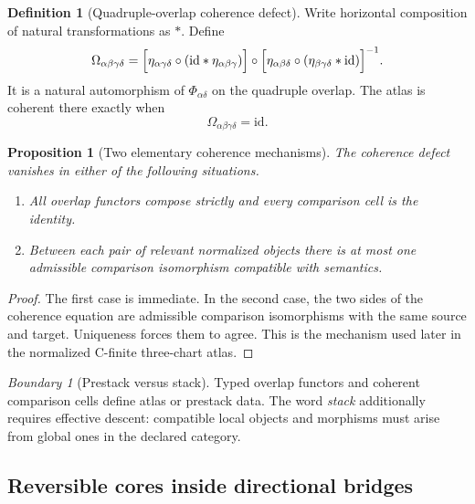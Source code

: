 \documentclass[11pt]{article}
\newtheorem{proposition}[theorem]{Proposition}
\theoremstyle{definition}
\newtheorem{definition}[theorem]{Definition}
\theoremstyle{remark}
\newtheorem{boundary}[theorem]{Boundary}
\newcommand{\id}{\mathrm{id}}
\begin{document}
\begin{definition}[Quadruple-overlap coherence defect]
\label{def:quadruple-coherence-defect}
Write horizontal composition of natural transformations as \(\ast\).  Define
\[
\Omega_{\alpha\beta\gamma\delta}
=
\Bigl[
\eta_{\alpha\gamma\delta}
\circ
(\id\ast\eta_{\alpha\beta\gamma})
\Bigr]
\circ
\Bigl[
\eta_{\alpha\beta\delta}
\circ
(\eta_{\beta\gamma\delta}\ast\id)
\Bigr]^{-1}.
\]
It is a natural automorphism of \(\Phi_{\alpha\delta}\) on the quadruple overlap.  The atlas is coherent there exactly when
\[
\Omega_{\alpha\beta\gamma\delta}=\id.
\]
\end{definition}

\begin{proposition}[Two elementary coherence mechanisms]
\label{prop:elementary-coherence-mechanisms}
The coherence defect vanishes in either of the following situations.
\begin{enumerate}[label=\textup{(\roman*)}]
\item All overlap functors compose strictly and every comparison cell is the identity.
\item Between each pair of relevant normalized objects there is at most one admissible comparison isomorphism compatible with semantics.
\end{enumerate}
\end{proposition}

\begin{proof}
The first case is immediate.  In the second case, the two sides of the coherence equation are admissible comparison isomorphisms with the same source and target.  Uniqueness forces them to agree.  This is the mechanism used later in the normalized C-finite three-chart atlas.
\end{proof}

\begin{boundary}[Prestack versus stack]
\label{bnd:prestack-versus-stack}
Typed overlap functors and coherent comparison cells define atlas or prestack data.  The word \emph{stack} additionally requires effective descent: compatible local objects and morphisms must arise from global ones in the declared category.
\end{boundary}

\subsection{Reversible cores inside directional bridges}
\label{subsec:reversible-core-directional}
\end{document}
